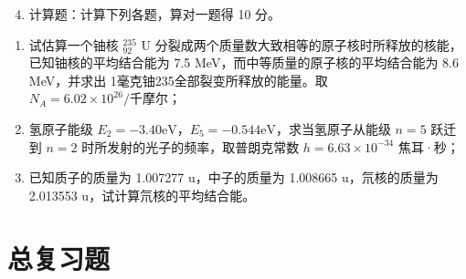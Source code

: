 \begin{enumerate}[label=\Roman*.]
\setcounter{enumi}{3}
\item
  计算题：计算下列各题，算对一题得 10 分。
\end{enumerate}

\begin{enumerate}
\item
  试估算一个铀核 \(^{235}_{92}\) U
  分裂成两个质量数大致相等的原子核时所释放的核能，已知铀核的平均结合能为
  7.5 MeV，而中等质量的原子核的平均结合能为 8.6 MeV，并求出
  1毫克铀235全部裂变所释放的能量。取
  \(N_A=6.02\times10^{26}/\text{千摩尔}\)；
\item
  氢原子能级
  \(E_{2} = -3.40\mathrm{eV}\)，\(E_{5} = -0.544\mathrm{eV}\)，求当氢原子从能级
  \(n = 5\) 跃迁到 \(n = 2\) 时所发射的光子的频率，取普朗克常数
  \(h = 6.63 \times 10^{-34}\) 焦耳·秒；
\item
  已知质子的质量为 1.007277 u，中子的质量为 1.008665 u，氘核的质量为
  2.013553 u，试计算氘核的平均结合能。
\end{enumerate}

\chapter{总复习题}

